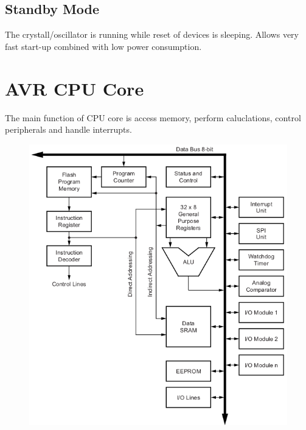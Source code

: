 \documentclass{article}
\begin{document}
\subsection{Standby Mode}
\quad The crystall/oscillator is running while reset of devices is sleeping. Allows very fast start-up combined with low power consumption.


\section{AVR CPU Core}
\quad The main function of CPU core is access memory, perform caluclations, control peripherals and handle interrupts.

\begin{figure}[H]
    \centering
    \includegraphics[height=0.7\textheight]{avrCoreBlockDiagram.png}
\end{figure}
\end{document}
